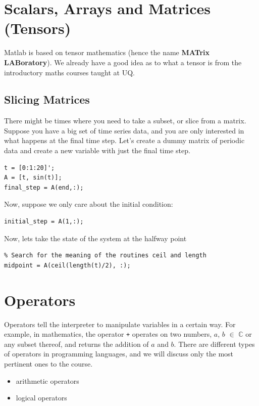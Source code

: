 \documentclass[12pt]{article}
\begin{document}
\section{Scalars, Arrays and Matrices (Tensors)}
\label{sec:tensors}

Matlab is based on tensor mathematics (hence the name \textbf{MATrix LABoratory}). We already have a good idea as to what a tensor is from the introductory maths courses taught at UQ. 

\subsection{Slicing Matrices}
There might be times where you need to take a subset, or slice from a matrix. Suppose you have a big set of time series data, and you are only interested in what happens at the final time step. Let's create a dummy matrix of periodic data and create a new variable with just the final time step.

\begin{lstlisting}
t = [0:1:20]';
A = [t, sin(t)];
final_step = A(end,:);
\end{lstlisting}

Now, suppose we only care about the initial condition:
\begin{lstlisting}
initial_step = A(1,:);
\end{lstlisting}

Now, lets take the state of the system at the halfway point
\begin{lstlisting}
% Search for the meaning of the routines ceil and length
midpoint = A(ceil(length(t)/2), :);
\end{lstlisting}
\newpage
\section{Operators}
Operators tell the interpreter to manipulate variables in a certain way. For example, in mathematics, the operator \texttt{+} operates on two numbers, $a$, $b$ $\in$ $\mathbb{C}$ or any subset thereof, and returns the addition of $a$ and $b$. There are different types of operators in programming languages, and we will discuss only the most pertinent ones to the course.
\begin{itemize}
\item arithmetic operators
\item logical operators
\end{itemize}
\end{document}
